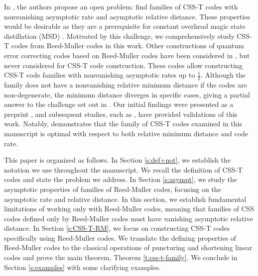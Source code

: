 \documentclass{amsart}
\theoremstyle{definition}
\begin{document}
\newpage
In \cite{CSS-T-isit}, the authors propose an open problem: find families of CSS-T codes with nonvanishing asymptotic rate and asymptotic relative distance. These properties would be desirable as they are a prerequisite for constant overhead magic state distillation (MSD) \cite{MSD}. 
Motivated by this challenge, we comprehensively study CSS-T codes from Reed-Muller codes in this work. Other constructions of quantum error correcting codes based on Reed-Muller codes have been considered in \cite{zh97,st99,CSS-T-it}, but never considered for CSS-T code construction. These codes allow constructing CSS-T code families with nonvanishing asymptotic rates up to $\frac{1}2$. Although the family does not have a nonvanishing relative minimum distance if the codes are non-degenerate,  the minimum distance diverges in specific cases, 
giving a partial answer to the challenge set out in \cite{CSS-T-isit}. Our initial findings were presented as a preprint \cite{ourpaper}, and subsequent studies, such as \cite{berardini_structure_2024,camps-moreno_algebraic_2024,campsmoreno2024quantumcsstcodessparse,csstallerton}, have provided validations of this work. Notably, \cite[Theorem 4.9]{berardini_structure_2024} demonstrates that the family of CSS-T codes examined in this manuscript is optimal with respect to both relative minimum distance and code rate.




This paper is organized as follows. In Section \ref{s:def+not}, we establish the notation we use throughout the manuscript. We recall the definition of CSS-T codes and state the problem we address. 
In Section \ref{s:asympt}, we study the asymptotic properties of families of Reed-Muller codes, focusing on the asymptotic rate and relative distance. In this section, we establish fundamental limitations of working only with Reed-Muller codes, meaning that families of CSS codes defined only by Reed-Muller codes must have vanishing asymptotic relative distance. In Section \ref{s:CSS-T-RM}, we focus on constructing CSS-T codes specifically using Reed-Muller codes. We translate the defining properties of Reed-Muller codes to the classical operations of puncturing and shortening linear codes and prove the main theorem, Theorem \ref{t:css-t-family}. We conclude in Section \ref{s:examples} with some clarifying examples. 
\end{document}
